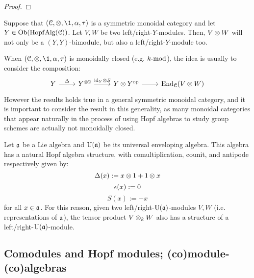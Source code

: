             \begin{proof}
                
            \end{proof}
        \begin{question} \label{question: tensor_products_of_modules_over_hopf_algebras}
            Suppose that $(\C, \tensor, \1, \alpha, \tau)$ is a symmetric monoidal category and let $Y \in \Ob( \Hopf\Alg(\C) )$. Let $V, W$ be two left/right-$Y$-modules. Then, $V \tensor W$ will not only be a $(Y, Y)$-bimodule, but also a left/right-$Y$-module too.

            When $(\C, \tensor, \1, \alpha, \tau)$ is monoidally closed (e.g. $k\mod$), the idea is usually to consider the composition:
                $$
                    \begin{tikzcd}
                        Y & {Y^{\tensor 2}} & {Y \tensor Y^{\op}} & {\End_{\C}(V \tensor W)}
                        \arrow["\Delta", from=1-1, to=1-2]
                        \arrow["{\id_Y \tensor S}", from=1-2, to=1-3]
                        \arrow[from=1-3, to=1-4]
                    \end{tikzcd}
                $$
            However the results holds true in a general symmetric monoidal category, and it is important to consider the result in this generality, as many monoidal categories that appear naturally in the process of using Hopf algebras to study group schemes are actually not monoidally closed.
        \end{question}
        \begin{example}
            Let $\a$ be a Lie algebra and $\rmU(\a)$ be its universal enveloping algebra. This algebra has a natural Hopf algebra structure, with comultiplication, counit, and antipode respectively given by:
                $$\Delta(x) := x \tensor 1 + 1 \tensor x$$
                $$\e(x) := 0$$
                $$S(x) := -x$$
            for all $x \in \a$. For this reason, given two left/right-$\rmU(\a)$-modules $V, W$ (i.e. representations of $\a$), the tensor product $V \tensor_k W$ also has a structure of a left/right-$\rmU(\a)$-module.
        \end{example}

    \subsection{Comodules and Hopf modules; (co)module-(co)algebras}
        \begin{definition} \label{def: comodules_over_coalgebras_in_monoidal_categories}
            
        \end{definition}